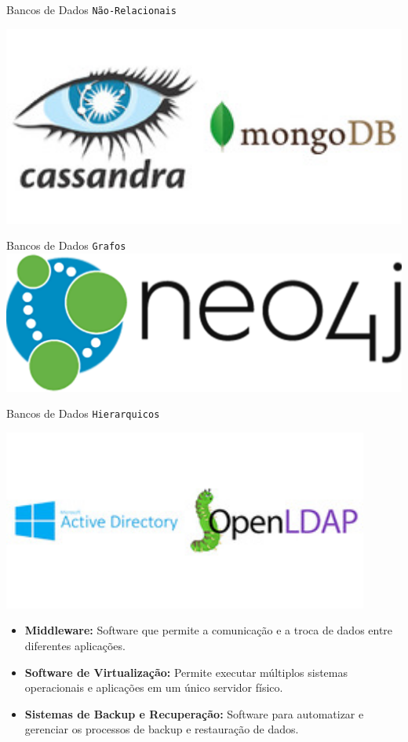 \documentclass[
]{book}
\begin{document}
Bancos de Dados \texttt{Não-Relacionais}

\includegraphics[width=7.11458in,height=\textheight]{images/InfraEstrutura/SGBD/nao-relacionais.jpg}

Bancos de Dados \texttt{Grafos} \includegraphics{images/InfraEstrutura/SGBD/neo4j.jpg}

Bancos de Dados \texttt{Hierarquicos}

\includegraphics[width=4.73958in,height=\textheight]{images/InfraEstrutura/SGBD/hierarquicos.jpg}

\begin{itemize}
\item
  \textbf{Middleware:} Software que permite a comunicação e a troca de dados entre diferentes aplicações.
\item
  \textbf{Software de Virtualização:} Permite executar múltiplos sistemas operacionais e aplicações em um único servidor físico.
\item
  \textbf{Sistemas de Backup e Recuperação:} Software para automatizar e gerenciar os processos de backup e restauração de dados.
\end{itemize}
\end{document}
